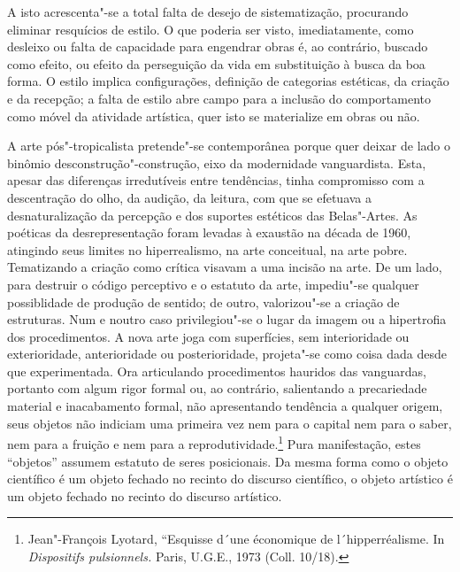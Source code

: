 A isto acrescenta"-se a total falta de desejo de sistematização,
procurando eliminar resquícios de estilo. O que poderia ser visto,
imediatamente, como desleixo ou falta de capacidade para engendrar obras
é, ao contrário, buscado como efeito, ou efeito da perseguição da vida
em substituição à busca da boa forma. O estilo implica configurações,
definição de categorias estéticas, da criação e da recepção; a falta de
estilo abre campo para a inclusão do comportamento como móvel da
atividade artística, quer isto se materialize em obras ou não.

\asterisc

A arte pós"-tropicalista pretende"-se contemporânea porque quer deixar de
lado o binômio desconstrução"-construção, eixo da modernidade
vanguardista. Esta, apesar das diferenças irredutíveis entre tendências,
tinha compromisso com a descentração do olho, da audição, da leitura,
com que se efetuava a desnaturalização da percepção e dos suportes
estéticos das Belas"-Artes. As poéticas da desrepresentação foram levadas
à exaustão na década de 1960, atingindo seus limites no hiperrealismo,
na arte conceitual, na arte pobre. Tematizando a criação como crítica
visavam a uma incisão na arte. De um lado, para destruir o código
perceptivo e o estatuto da arte, impediu"-se qualquer possiblidade de
produção de sentido; de outro, valorizou"-se a criação de estruturas. Num
e noutro caso privilegiou"-se o lugar da imagem ou a hipertrofia dos
procedimentos. A nova arte joga com superfícies, sem interioridade ou
exterioridade, anterioridade ou posterioridade, projeta"-se como coisa
dada desde que experimentada. Ora articulando procedimentos hauridos das
vanguardas, portanto com algum rigor formal ou, ao contrário,
salientando a precariedade material e inacabamento formal, não
apresentando tendência a qualquer origem, seus objetos não indiciam uma
primeira vez nem para o capital nem para o saber, nem para a fruição e
nem para a reprodutividade.\footnote{Jean"-François Lyotard, ``Esquisse
  d´une économique de l´hipperréalisme. In \emph{Dispositifs
  pulsionnels.} Paris, \textsc{U.G.E.}, 1973 (Coll. 10/18).} Pura manifestação,
estes ``objetos'' assumem estatuto de seres posicionais. Da mesma forma
como o objeto científico é um objeto fechado no recinto do discurso
científico, o objeto artístico é um objeto fechado no recinto do
discurso artístico.

